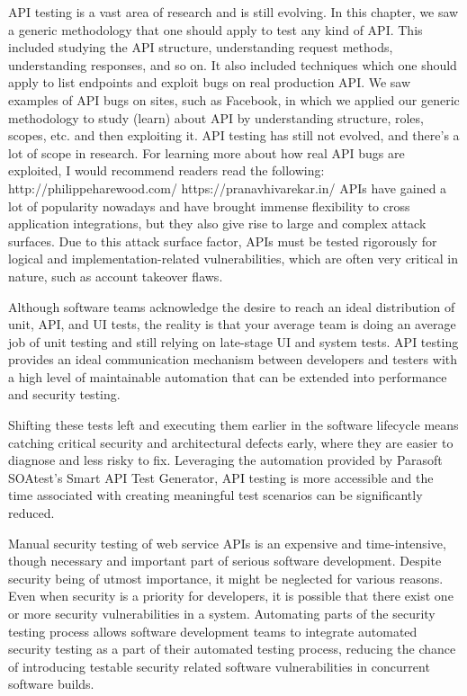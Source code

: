 API testing is a vast area of research and is still evolving. In this chapter, we saw a
generic methodology that one should apply to test any kind of API. This included
studying the API structure, understanding request methods, understanding
responses, and so on. It also included techniques which one should apply to list
endpoints and exploit bugs on real production API. We saw examples of API bugs
on sites, such as Facebook, in which we applied our generic methodology to study
(learn) about API by understanding structure, roles, scopes, etc. and then exploiting
it. API testing has still not evolved, and there's a lot of scope in research.
For learning more about how real API bugs are exploited, I would recommend
readers read the following:
http://philippeharewood.com/
https://pranavhivarekar.in/
APIs have gained a lot of popularity nowadays and have brought immense flexibility
to cross application integrations, but they also give rise to large and complex attack
surfaces. Due to this attack surface factor, APIs must be tested rigorously for logical
and implementation-related vulnerabilities, which are often very critical in nature,
such as account takeover flaws.


Although software teams acknowledge the desire to reach an ideal distribution of unit, API, and UI tests, the reality is that your average team is doing an average job of unit testing and still relying on late-stage UI and system tests. API testing provides an ideal communication mechanism between developers and testers with a high level of maintainable automation that can be extended into performance and security testing.

Shifting these tests left and executing them earlier in the software lifecycle means catching critical security and architectural defects early, where they are easier to diagnose and less risky to fix. Leveraging the automation provided by Parasoft SOAtest's Smart API Test Generator, API testing is more accessible and the time associated with creating meaningful test scenarios can be significantly reduced.



Manual security testing of web service APIs is an expensive and time-intensive, though
necessary and important part of serious software development. Despite security being of
utmost importance, it might be neglected for various reasons. Even when security is a
priority for developers, it is possible that there exist one or more security vulnerabilities
in a system. Automating parts of the security testing process allows software development
teams to integrate automated security testing as a part of their automated testing process,
reducing the chance of introducing testable security related software vulnerabilities in concurrent software builds.



